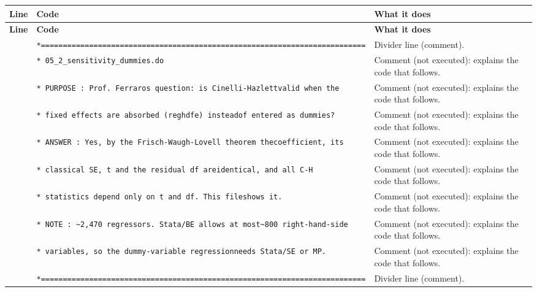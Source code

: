 \documentclass[10pt]{article}
\newcommand{\codetable}[1]{%
{\footnotesize
\begin{longtable}{>{\raggedleft\arraybackslash}p{0.55cm}>{\raggedright\arraybackslash}p{8.3cm}>{\raggedright\arraybackslash}p{8.0cm}}
\toprule \textbf{Line} & \textbf{Code} & \textbf{What it does}\\ \midrule \endfirsthead
\toprule \textbf{Line} & \textbf{Code} & \textbf{What it does}\\ \midrule \endhead
\bottomrule \endfoot
#1
\end{longtable}}}
\begin{document}
\codetable{1 & \texttt{*=========================================================\newline \hspace*{1em}=================} & Divider line (comment).\\
2 & \texttt{* 05\_2\_sensitivity\_dummies.do} & Comment (not executed): explains the code that follows.\\
3 & \texttt{* PURPOSE : Prof. Ferraro\textquotesingle{}s question: is Cinelli-{}Hazlett\newline \hspace*{1em}valid when the} & Comment (not executed): explains the code that follows.\\
4 & \texttt{*           fixed effects are absorbed (reghdfe) instead\newline \hspace*{1em}of entered as dummies?} & Comment (not executed): explains the code that follows.\\
5 & \texttt{* ANSWER  : Yes, by the Frisch-{}Waugh-{}Lovell theorem the\newline \hspace*{1em}coefficient, its} & Comment (not executed): explains the code that follows.\\
6 & \texttt{*           classical SE, t and the residual df are\newline \hspace*{1em}identical, and all C-{}H} & Comment (not executed): explains the code that follows.\\
7 & \texttt{*           statistics depend only on t and df. This file\newline \hspace*{1em}shows it.} & Comment (not executed): explains the code that follows.\\
8 & \texttt{* NOTE    : \textasciitilde{}2,470 regressors. Stata/BE allows at most\newline \hspace*{1em}\textasciitilde{}800 right-{}hand-{}side} & Comment (not executed): explains the code that follows.\\
9 & \texttt{*           variables, so the dummy-{}variable regression\newline \hspace*{1em}needs Stata/SE or MP.} & Comment (not executed): explains the code that follows.\\
10 & \texttt{*=========================================================\newline \hspace*{1em}=================} & Divider line (comment).\\
}
\end{document}
